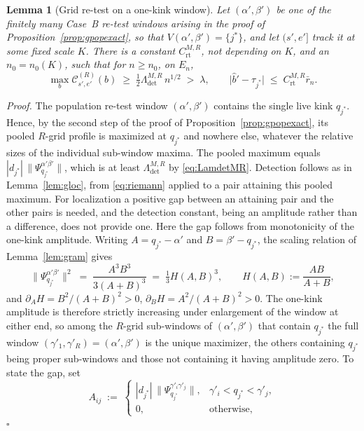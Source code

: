 \documentclass[12pt, a4paper]{article}
\newcommand{\qed}{\hfill$\square$}
\newenvironment{proof}[1][Proof]{\par\noindent\textit{#1.}\space}{\qed\par\medskip}
\newtheorem{lemma}{Lemma}[section]
\begin{document}
\begin{lemma}[Grid re-test on a one-kink window]
\label{lem:grt}
Let $(\alpha',\beta')$ be one of the finitely many Case~B re-test windows arising in the proof of Proposition~\ref{prop:gpopexact}, so that $V(\alpha',\beta') = \{j^*\}$, and let $(s',e']$ track it at some fixed scale $K$. There is a constant $C^{M,R}_{\mathrm{rt}}$, not depending on $K$, and an $n_0 = n_0(K)$, such that for $n \ge n_0$, on $E_n$,
\[
\max_b \mathcal{C}^{(R)}_{s',e'}(b) \;\ge\; \tfrac12 \Lambda^{M,R}_{\mathrm{det}}\, n^{1/2} \;>\; \lambda,
\qquad
\big| \hat b' - \tau_{j^*} \big| \;\le\; C^{M,R}_{\mathrm{rt}} \bar r_n .
\]
\end{lemma}

\begin{proof}
The population re-test window $(\alpha',\beta')$ contains the single live kink
$q_{j^*}$. Hence, by the second step of the proof of
Proposition~\ref{prop:gpopexact}, its pooled $R$-grid profile is maximized at
$q_{j^*}$ and nowhere else, whatever the relative sizes of the individual
sub-window maxima. The pooled maximum equals
$|d_{j^*}|\,\|\Psi^{\alpha'\beta'}_{q_{j^*}}\|$, which is at least
$\Lambda^{M,R}_{\mathrm{det}}$ by \eqref{eq:LamdetMR}. Detection follows as in
Lemma~\ref{lem:gloc}, from \eqref{eq:riemann} applied to a pair attaining this
pooled maximum. For localization a positive gap between an attaining pair and
the other pairs is needed, and the detection constant, being an amplitude
rather than a difference, does not provide one. Here the gap follows from
monotonicity of the one-kink amplitude. Writing
$A=q_{j^*}-\alpha'$ and $B=\beta'-q_{j^*}$, the scaling relation of
Lemma~\ref{lem:gram} gives
\[
\big\|\Psi^{\alpha'\beta'}_{q_{j^*}}\big\|^2 \;=\; \frac{A^3B^3}{3(A+B)^3} \;=\; \tfrac13 H(A,B)^3,
\qquad H(A,B) := \frac{AB}{A+B},
\]
and $\partial_A H = B^2/(A+B)^2 > 0$, $\partial_B H = A^2/(A+B)^2 > 0$. The one-kink amplitude is therefore strictly increasing under enlargement of the window at either end, so among the $R$-grid sub-windows of $(\alpha',\beta')$ that contain $q_{j^*}$ the full window $(\gamma'_1,\gamma'_R) = (\alpha',\beta')$ is the unique maximizer, the others containing $q_{j^*}$ being proper sub-windows and those not containing it having amplitude zero. To state the gap, set
\[
A_{ij} \;:=\;
\begin{cases}
|d_{j^*}| \, \big\|\Psi^{\gamma'_i\gamma'_j}_{q_{j^*}}\big\| , & \gamma'_i < q_{j^*} < \gamma'_j, \\[2pt]
0, & \text{otherwise},
\end{cases}
\]
\end{proof}
\end{document}
